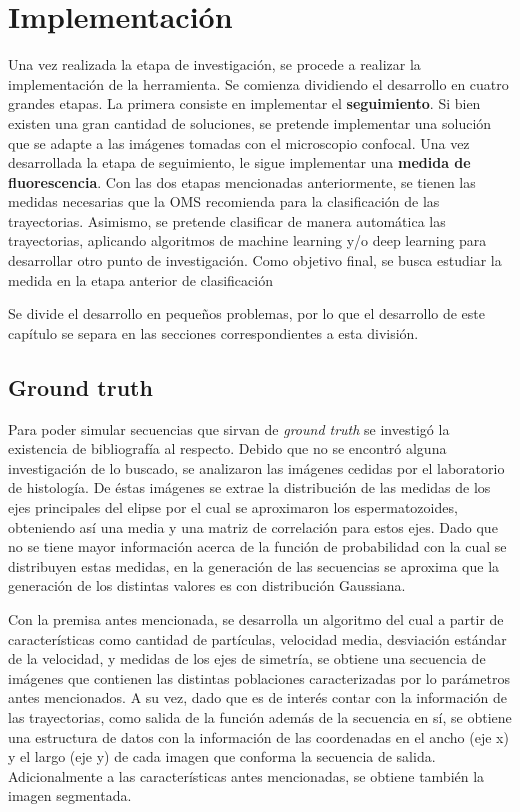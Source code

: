 \chapter{Implementación}

Una vez realizada la etapa de investigación, se procede a realizar la implementación de la herramienta. Se comienza dividiendo el desarrollo en cuatro grandes etapas. La primera consiste en implementar el \textbf{seguimiento}. Si bien existen una gran cantidad de soluciones, se pretende implementar una solución que se adapte a las imágenes tomadas con el microscopio confocal. 
Una vez desarrollada la etapa de seguimiento, le sigue implementar una \textbf{medida de fluorescencia}. 
Con las dos etapas mencionadas anteriormente, se tienen las medidas necesarias que la OMS recomienda para la clasificación de las trayectorias. Asimismo, se pretende clasificar de manera automática las trayectorias, aplicando algoritmos de machine learning y/o deep learning para desarrollar otro punto de investigación. 
Como objetivo final, se busca estudiar la  medida en la etapa anterior de clasificación


Se divide el desarrollo en pequeños problemas, por lo que el desarrollo de este capítulo se separa en las secciones correspondientes a esta división.


\section{Ground truth}
Para poder simular secuencias que sirvan de \textit{ground truth} se investigó la existencia de bibliografía al respecto. Debido que no se encontró alguna investigación de lo buscado, se analizaron las imágenes cedidas por el laboratorio de histología. De éstas imágenes se extrae la distribución de las medidas de los ejes principales del elipse por el cual se aproximaron los espermatozoides, obteniendo así una media y una matriz de correlación para estos ejes. Dado que no se tiene mayor información acerca de la función de probabilidad con la cual se distribuyen estas medidas, en la generación de las secuencias se aproxima que la generación de los distintas valores es con distribución Gaussiana. 

Con la premisa antes mencionada, se desarrolla un algoritmo del cual a partir de características como cantidad de partículas, velocidad media, desviación estándar de la velocidad, y medidas de los ejes de simetría, se obtiene una secuencia de imágenes que contienen las distintas poblaciones caracterizadas por lo parámetros antes mencionados. A su vez, dado que es de interés contar con la información de las trayectorias, como salida de la función además de la secuencia en sí, se obtiene una estructura de datos con la información de las coordenadas en el ancho (eje x) y el largo (eje y) de cada imagen que conforma la secuencia de salida. Adicionalmente a las características antes mencionadas, se obtiene también la imagen segmentada. 

